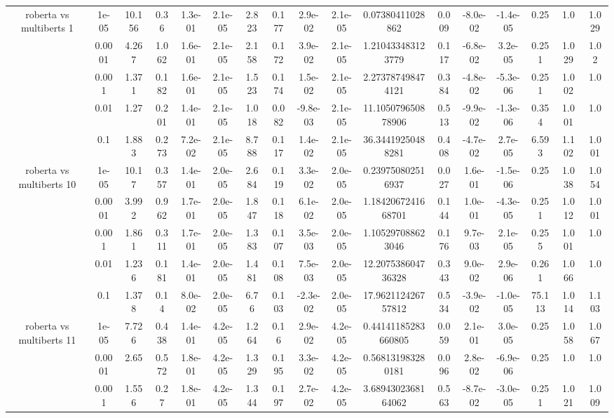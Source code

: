 \begin{tabular}{|c|c|c|c|c|c|c|c|c|c|c|c|c|c|c|c|c|}
\hline
\multirow{5}{*}{roberta  vs multiberts 1} & 1e-05 & 10.156 & 0.36 & 1.3e-01 & 2.1e-05 & 2.823 & 0.177 & 2.9e-02 & 2.1e-05 & 0.07380411028862 & 0.009 & -8.0e-02 & -1.4e-05 & 0.25 & 1.0 & 1.029 \\
 & 0.0001 & 4.267 & 1.062 & 1.6e-01 & 2.1e-05 & 2.158 & 0.172 & 3.9e-02 & 2.1e-05 & 1.210433483123779 & 0.117 & -6.8e-02 & 3.2e-05 & 0.251 & 1.029 & 1.02 \\
 & 0.001 & 1.371 & 0.182 & 1.6e-01 & 2.1e-05 & 1.523 & 0.174 & 1.5e-02 & 2.1e-05 & 2.273787498474121 & 0.384 & -4.8e-02 & -5.3e-06 & 0.251 & 1.002 & 1.0 \\
 & 0.01 & 1.27 & 0.201 & 1.4e-01 & 2.1e-05 & 1.018 & 0.082 & -9.8e-03 & 2.1e-05 & 11.105079650878906 & 0.513 & -9.9e-02 & -1.3e-06 & 0.354 & 1.001 & 1.0 \\
 & 0.1 & 1.883 & 0.273 & 7.2e-02 & 2.1e-05 & 8.788 & 0.117 & 1.4e-02 & 2.1e-05 & 36.34419250488281 & 0.408 & -4.7e-02 & 2.7e-05 & 6.593 & 1.102 & 1.001 \\
\hline
\multirow{5}{*}{roberta  vs multiberts 10} & 1e-05 & 10.17 & 0.357 & 1.4e-01 & 2.0e-05 & 2.684 & 0.119 & 3.3e-02 & 2.0e-05 & 0.239750802516937 & 0.027 & 1.6e-01 & -1.5e-06 & 0.25 & 1.038 & 1.054 \\
 & 0.0001 & 3.992 & 0.962 & 1.7e-01 & 2.0e-05 & 1.847 & 0.118 & 6.1e-02 & 2.0e-05 & 1.1842067241668701 & 0.144 & 1.0e-01 & -4.3e-05 & 0.251 & 1.012 & 1.001 \\
 & 0.001 & 1.861 & 0.311 & 1.7e-01 & 2.0e-05 & 1.383 & 0.107 & 3.5e-03 & 2.0e-05 & 1.105297088623046 & 0.176 & 9.7e-03 & 2.1e-05 & 0.255 & 1.001 & 1.0 \\
 & 0.01 & 1.236 & 0.181 & 1.4e-01 & 2.0e-05 & 1.481 & 0.108 & 7.5e-03 & 2.0e-05 & 12.207538604736328 & 0.343 & 9.0e-02 & 2.9e-06 & 0.261 & 1.066 & 1.0 \\
 & 0.1 & 1.378 & 0.14 & 8.0e-02 & 2.0e-05 & 6.76 & 0.103 & -2.3e-02 & 2.0e-05 & 17.962112426757812 & 0.534 & -3.9e-02 & -1.0e-05 & 75.113 & 1.014 & 1.103 \\
\hline
\multirow{5}{*}{roberta  vs multiberts 11} & 1e-05 & 7.726 & 0.438 & 1.4e-01 & 4.2e-05 & 1.264 & 0.16 & 2.9e-02 & 4.2e-05 & 0.44141185283660805 & 0.059 & 2.1e-01 & 3.0e-05 & 0.25 & 1.058 & 1.067 \\
 & 0.0001 & 2.65 & 0.572 & 1.8e-01 & 4.2e-05 & 1.329 & 0.195 & 3.3e-02 & 4.2e-05 & 0.568131983280181 & 0.096 & 2.8e-02 & -6.9e-06 & 0.25 & 1.0 & 1.0 \\
 & 0.001 & 1.556 & 0.27 & 1.8e-01 & 4.2e-05 & 1.344 & 0.197 & 2.7e-02 & 4.2e-05 & 3.6894302368164062 & 0.563 & -8.7e-02 & -3.0e-05 & 0.251 & 1.021 & 1.009 \\

\end{tabular}
